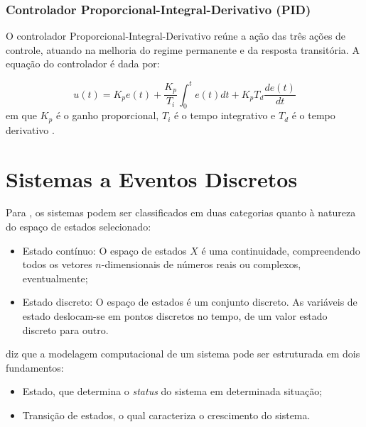 \subsubsection{Controlador Proporcional-Integral-Derivativo (PID)}

O controlador Proporcional-Integral-Derivativo reúne a ação das três ações de controle, atuando na melhoria do 
regime permanente e da resposta transitória. 
A equação do controlador é dada por:

\begin{equation}
 u(t) = K_pe(t) + \frac{K_p}{T_i}\int_{0}^{t}e(t)dt + K_pT_d\frac{de(t)}{dt}
\end{equation}
em que  $K_p$ é o ganho proporcional, $T_i$ é o tempo integrativo e $T_d$ é o tempo derivativo \cite{ogata}.


%
%


\vspace{1cm}
\section{Sistemas a Eventos Discretos} \label{cap:sed}


Para , os sistemas podem ser classificados em duas categorias quanto à natureza do espaço de estados 
selecionado: 
\begin{itemize}
 \item Estado contínuo: O espaço de estados $X$ é uma continuidade, compreendendo todos os vetores $n$-dimensionais de números reais ou 
 complexos, eventualmente;
 
 \item Estado discreto: O espaço de estados é um conjunto discreto. As variáveis de estado deslocam-se em pontos discretos no tempo, de 
 um valor estado discreto para outro.
\end{itemize}

 diz que a modelagem computacional de um sistema pode ser estruturada em dois fundamentos:
\begin{itemize}
 \item Estado, que determina o \textit{status} do sistema em determinada situação;
 \item Transição de estados, o qual caracteriza o crescimento do sistema.
\end{itemize}

